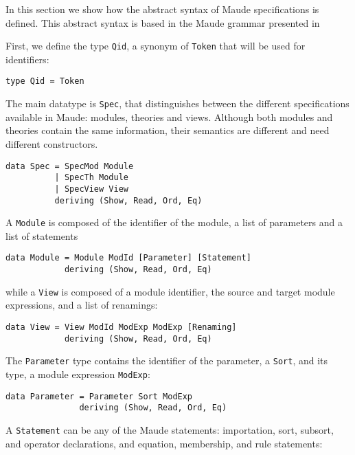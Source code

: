 
In this section we show how the abstract syntax of Maude specifications
is defined. This abstract syntax is based in the Maude grammar presented
in \cite[Chapter 24]{maude-book}

First, we define the type \verb"Qid", a synonym of \verb"Token" that
will be used for identifiers:

{\codesize
\begin{verbatim}
type Qid = Token
\end{verbatim}
}

The main datatype is \verb"Spec", that distinguishes between the
different specifications available in Maude: modules, theories and
views. Although both modules and theories contain the same information,
their semantics are different and need different constructors.

{\codesize
\begin{verbatim}
data Spec = SpecMod Module
          | SpecTh Module
          | SpecView View
          deriving (Show, Read, Ord, Eq)
\end{verbatim}
}

A \verb"Module" is composed of the identifier of the module, a list
of parameters and a list of statements

{\codesize
\begin{verbatim}
data Module = Module ModId [Parameter] [Statement]
            deriving (Show, Read, Ord, Eq)
\end{verbatim}
}

\noindent while a \verb"View" is composed of a module identifier, the
source and target module expressions, and a list of renamings:

{\codesize
\begin{verbatim}
data View = View ModId ModExp ModExp [Renaming]
            deriving (Show, Read, Ord, Eq)
\end{verbatim}
}

The \verb"Parameter" type contains the identifier of the parameter,
a \verb"Sort", and its type, a module expression \verb"ModExp":

{\codesize
\begin{verbatim}
data Parameter = Parameter Sort ModExp
               deriving (Show, Read, Ord, Eq)
\end{verbatim}
}

A \verb"Statement" can be any of the Maude statements:
importation, sort, subsort, and operator declarations, and
equation, membership, and rule statements:

